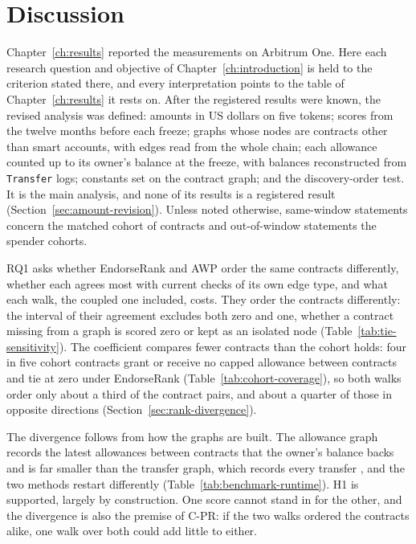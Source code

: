 \chapter{Discussion}
\label{ch:discussion}

Chapter~\ref{ch:results} reported the measurements on Arbitrum One. Here each research question and objective of Chapter~\ref{ch:introduction} is held to the criterion stated there, and every interpretation points to the table of Chapter~\ref{ch:results} it rests on. After the registered results were known, the revised analysis was defined: amounts in US dollars on five tokens; scores from the twelve months before each freeze; graphs whose nodes are contracts other than smart accounts, with edges read from the whole chain; each allowance counted up to its owner's balance at the freeze, with balances reconstructed from \texttt{Transfer} logs; constants set on the contract graph; and the discovery-order test. It is the main analysis, and none of its results is a registered result (Section~\ref{sec:amount-revision}). Unless noted otherwise, same-window statements concern the matched cohort of contracts and out-of-window statements the spender cohorts.



RQ1 asks whether EndorseRank and AWP order the same contracts differently, whether each agrees most with current checks of its own edge type, and what each walk, the coupled one included, costs. They order the contracts differently: the interval of their agreement excludes both zero and one, whether a contract missing from a graph is scored zero or kept as an isolated node (Table~\ref{tab:tie-sensitivity}). The coefficient compares fewer contracts than the cohort holds: four in five cohort contracts grant or receive no capped allowance between contracts and tie at zero under EndorseRank (Table~\ref{tab:cohort-coverage}), so both walks order only about a third of the contract pairs, and about a quarter of those in opposite directions (Section~\ref{sec:rank-divergence}).

The divergence follows from how the graphs are built. The allowance graph records the latest allowances between contracts that the owner's balance backs and is far smaller than the transfer graph, which records every transfer \parencite{do2023awp}, and the two methods restart differently (Table~\ref{tab:benchmark-runtime}). H1 is supported, largely by construction. One score cannot stand in for the other, and the divergence is also the premise of \mbox{C-PR}: if the two walks ordered the contracts alike, one walk over both could add little to either.

